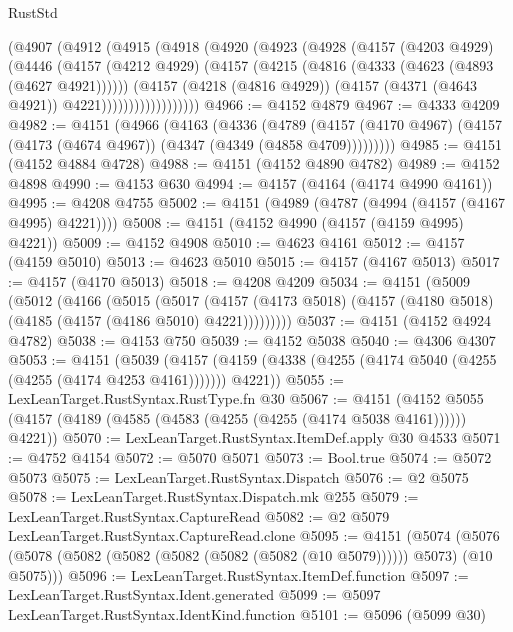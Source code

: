 \begin{lexlean}{RustStd}
\begin{coremodule}
              (@4907
                (@4912
                  (@4915
                    (@4918
                      (@4920
                        (@4923
                          (@4928
                            (@4157
                              (@4203 @4929)
                              (@4446
                                (@4157
                                  (@4212 @4929)
                                  (@4157
                                    (@4215 (@4816 (@4333 (@4623 (@4893 (@4627 @4921))))))
                                    (@4157
                                      (@4218 (@4816 @4929))
                                      (@4157 (@4371 (@4643 @4921)) @4221))))))))))))))))))
@4966 := @4152 @4879
@4967 := @4333 @4209
@4982 := @4151
    (@4966
      (@4163
        (@4336
          (@4789
            (@4157 (@4170 @4967) (@4157 (@4173 (@4674 @4967)) (@4347 (@4349 (@4858 @4709)))))))))
@4985 := @4151 (@4152 @4884 @4728)
@4988 := @4151 (@4152 @4890 @4782)
@4989 := @4152 @4898
@4990 := @4153 @630
@4994 := @4157 (@4164 (@4174 @4990 @4161))
@4995 := @4208 @4755
@5002 := @4151 (@4989 (@4787 (@4994 (@4157 (@4167 @4995) @4221))))
@5008 := @4151 (@4152 @4990 (@4157 (@4159 @4995) @4221))
@5009 := @4152 @4908
@5010 := @4623 @4161
@5012 := @4157 (@4159 @5010)
@5013 := @4623 @5010
@5015 := @4157 (@4167 @5013)
@5017 := @4157 (@4170 @5013)
@5018 := @4208 @4209
@5034 := @4151
    (@5009
      (@5012
        (@4166
          (@5015
            (@5017
              (@4157 (@4173 @5018) (@4157 (@4180 @5018) (@4185 (@4157 (@4186 @5010) @4221)))))))))
@5037 := @4151 (@4152 @4924 @4782)
@5038 := @4153 @750
@5039 := @4152 @5038
@5040 := @4306 @4307
@5053 := @4151
    (@5039 (@4157 (@4159 (@4338 (@4255 (@4174 @5040 (@4255 (@4255 (@4174 @4253 @4161))))))) @4221))
@5055 := LexLeanTarget.RustSyntax.RustType.fn @30
@5067 := @4151
    (@4152 @5055 (@4157 (@4189 (@4585 (@4583 (@4255 (@4255 (@4174 @5038 @4161)))))) @4221))
@5070 := LexLeanTarget.RustSyntax.ItemDef.apply @30 @4533
@5071 := @4752 @4154
@5072 := @5070 @5071
@5073 := Bool.true
@5074 := @5072 @5073
@5075 := LexLeanTarget.RustSyntax.Dispatch
@5076 := @2 @5075
@5078 := LexLeanTarget.RustSyntax.Dispatch.mk @255
@5079 := LexLeanTarget.RustSyntax.CaptureRead
@5082 := @2 @5079 LexLeanTarget.RustSyntax.CaptureRead.clone
@5095 := @4151
    (@5074 (@5076 (@5078 (@5082 (@5082 (@5082 (@5082 (@5082 (@10 @5079)))))) @5073) (@10 @5075)))
@5096 := LexLeanTarget.RustSyntax.ItemDef.function
@5097 := LexLeanTarget.RustSyntax.Ident.generated
@5099 := @5097 LexLeanTarget.RustSyntax.IdentKind.function
@5101 := @5096 (@5099 @30)

\end{coremodule}
\end{lexlean}
